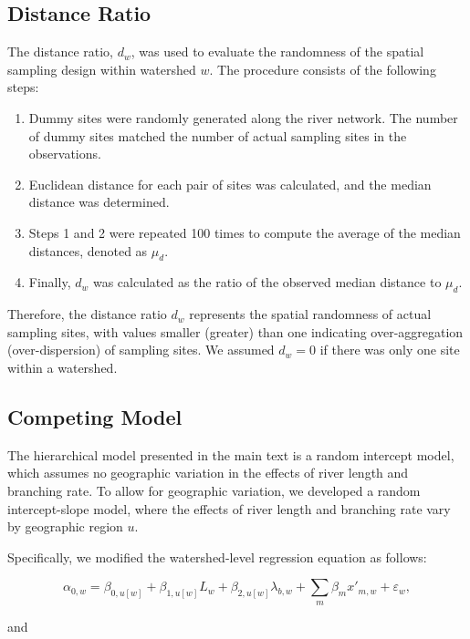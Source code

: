 \documentclass[11pt, class=article, crop=false]{standalone}
\theoremstyle{definition}
\begin{document}
\subsection{Distance Ratio}

The distance ratio, $d_{w}$, was used to evaluate the randomness of the spatial sampling design within watershed $w$.
The procedure consists of the following steps:

\begin{enumerate}
    \item Dummy sites were randomly generated along the river network. The number of dummy sites matched the number of actual sampling sites in the observations.
    \item Euclidean distance for each pair of sites was calculated, and the median distance was determined.
    \item Steps 1 and 2 were repeated 100 times to compute the average of the median distances, denoted as $\mu_d$.
    \item Finally, $d_{w}$ was calculated as the ratio of the observed median distance to $\mu_d$.
\end{enumerate}

Therefore, the distance ratio $d_{w}$ represents the spatial randomness of actual sampling sites, with values smaller (greater) than one indicating over-aggregation (over-dispersion) of sampling sites.
We assumed $d_{w} = 0$ if there was only one site within a watershed.

\subsection{Competing Model}

The hierarchical model presented in the main text is a random intercept model, which assumes no geographic variation in the effects of river length and branching rate. To allow for geographic variation, we developed a random intercept-slope model, where the effects of river length and branching rate vary by geographic region $u$.

Specifically, we modified the watershed-level regression equation as follows:

\begin{equation}
    \alpha_{0, w} = \beta_{0, u[w]} + \beta_{1, u[w]} L_w + \beta_{2, u[w]} \lambda_{b, w} + \sum_m \beta_m x'_{m, w} + \varepsilon_{w},
    \label{eq:watershed-average}
\end{equation}

and
\end{document}
